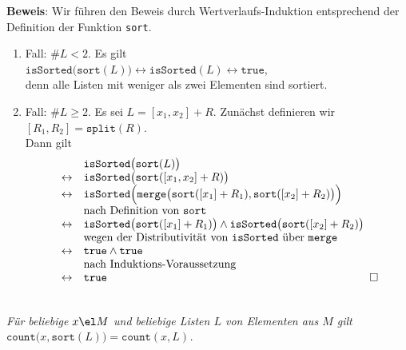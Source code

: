 \noindent
\textbf{Beweis}: Wir f\"uhren den Beweis durch Wertverlaufs-Induktion entsprechend der Definition
der Funktion \texttt{sort}.
\begin{enumerate}
\item Fall: $\#L < 2$.  Es gilt \\[0.1cm]
      \hspace*{1.3cm} 
      $\mathtt{isSorted}\bigl(\mathtt{sort}(L)\bigr) \leftrightarrow \mathtt{isSorted}(L) \leftrightarrow \mathtt{true}$, \\[0.1cm]
      denn alle Listen mit weniger als zwei Elementen sind sortiert.
\item Fall: $\#L \geq 2$. Es sei $L = [x_1,x_2] + R$.  Zun\"achst definieren wir \\[0.1cm]
      \hspace*{1.3cm} $[R_1,R_2] = \mathtt{split}(R)$. \\[0.1cm]
      Dann gilt 
      \[
      \begin{array}[b]{cl}
                      & \mathtt{isSorted}\bigl(\mathtt{sort}(L)\bigr) \\
      \leftrightarrow & \mathtt{isSorted}\bigl(\mathtt{sort}([x_1,x_2] + R)\bigr) \\
      \leftrightarrow & \mathtt{isSorted}\Bigl(\mathtt{merge}\bigl(\mathtt{sort}([x_1] + R_1), \mathtt{sort}([x_2] + R_2)\bigr)\Bigr) \\
                      & \mbox{nach Definition von \texttt{sort}} \\
      \leftrightarrow & \mathtt{isSorted}\bigl(\mathtt{sort}([x_1] + R_1)\bigr) \wedge \mathtt{isSorted}\bigl(\mathtt{sort}([x_2] + R_2)\bigr) \\
                      & \mbox{wegen der Distributivit\"at von \texttt{isSorted} \"uber \texttt{merge}} \\
      \leftrightarrow & \mathtt{true} \wedge \mathtt{true} \\
                      & \mbox{nach Induktions-Voraussetzung} \\
      \leftrightarrow & \mathtt{true} 
      \end{array}\hspace*{\fill} \Box
      \]
\end{enumerate}

\begin{Proposition} \hspace*{\fill} \\
{\em
  F\"ur beliebige $x\el M$ und beliebige Listen $L$ von Elementen aus $M$ gilt \\[0.1cm]
  \hspace*{1.3cm} $\mathtt{count}\bigl(x,\mathtt{sort}(L)\bigr) = \mathtt{count}(x,L)$.
}
\end{Proposition}

